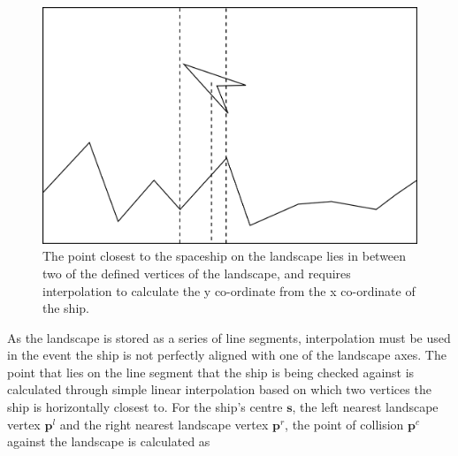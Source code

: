 \documentclass[conference]{IEEEtran}
\begin{document}
\begin{figure}[hbtp]
\centering
\includegraphics[scale=0.4]{graphics/landscapepoint}
\caption{The point closest to the spaceship on the landscape lies in between two of the defined vertices of the landscape, and requires interpolation to calculate the y co-ordinate from the x co-ordinate of the ship.}
\label{fig:diagram_landscapepoint}
\end{figure}

As the landscape is stored as a series of line segments, interpolation must be used in the event the ship is not perfectly aligned with one of the landscape axes. The point that lies on the line segment that the ship is being checked against is calculated through simple linear interpolation based on which two vertices the ship is horizontally closest to. For the ship's centre $\bm {s}$, the left nearest landscape vertex $\bm {p}^{l}$ and the right nearest landscape vertex $\bm {p}^{r}$, the point of collision $\bm {p}^{c}$ against the landscape is calculated as 

\end{document}

